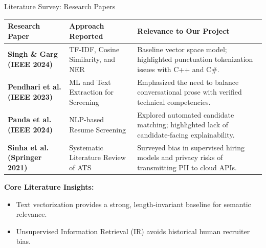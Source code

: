 \documentclass[aspectratio=169, 10pt]{beamer}
\begin{document}
\begin{frame}{Literature Survey: Research Papers}
  \small
  \begin{table}[h]
    \centering
    \begin{tabular}{p{3.2cm} p{4.2cm} p{5.6cm}}
      \toprule
      \textbf{Research Paper} & \textbf{Approach Reported} & \textbf{Relevance to Our Project} \\
      \midrule
      \textbf{Singh \& Garg (IEEE 2024)} & TF-IDF, Cosine Similarity, and NER & Baseline vector space model; highlighted punctuation tokenization issues with C++ and C\#. \\
      \textbf{Pendhari et al. (IEEE 2023)} & ML and Text Extraction for Screening & Emphasized the need to balance conversational prose with verified technical competencies. \\
      \textbf{Panda et al. (IEEE 2024)} & NLP-based Resume Screening & Explored automated candidate matching; highlighted lack of candidate-facing explainability. \\
      \textbf{Sinha et al. (Springer 2021)} & Systematic Literature Review of ATS & Surveyed bias in supervised hiring models and privacy risks of transmitting PII to cloud APIs. \\
      \bottomrule
    \end{tabular}
  \end{table}

  \vspace{-0.1cm}
  \textbf{Core Literature Insights:}
  \begin{itemize}
    \item Text vectorization provides a strong, length-invariant baseline for semantic relevance.
    \item Unsupervised Information Retrieval (IR) avoids historical human recruiter bias.
  \end{itemize}
\end{frame}
\end{document}
